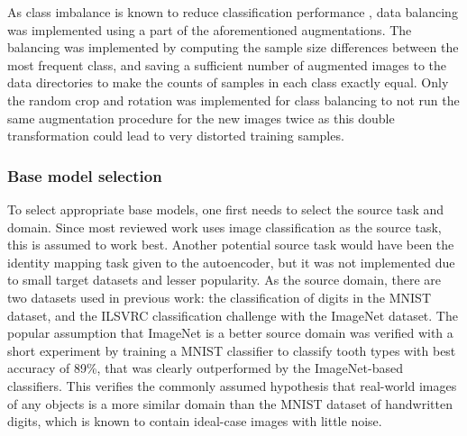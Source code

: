 \documentclass{article}
\begin{document}
As class imbalance is known to reduce classification performance \cite{heLearningImbalancedData2009},
data balancing was implemented using a part of the aforementioned augmentations.
The balancing was implemented by computing the sample size differences between 
the most frequent class, and saving a sufficient number of augmented images 
to the data directories to make the counts of samples in each class 
exactly equal. Only the random crop and rotation was implemented for class 
balancing to not run the same augmentation procedure for the new images twice as 
this double transformation could lead to very distorted training samples.

\subsubsection{Base model selection}



To select appropriate base models, one first needs to select the source task and domain. Since most reviewed work uses image classification as the source task, this is assumed to work best.
Another potential source task would have been the identity mapping task given to the autoencoder,
but it was not implemented due to small target datasets and lesser popularity.
As the source domain, there are two datasets used in previous work: the classification of digits in the MNIST dataset, 
and the ILSVRC classification challenge with the ImageNet dataset. The popular 
assumption that ImageNet is a better source domain was verified with a short experiment by training a MNIST classifier \cite{jamilemnist}
to classify tooth types with best accuracy of 89\%, that was clearly outperformed by the ImageNet-based classifiers. This verifies the commonly assumed hypothesis that real-world images of any objects is a more 
similar domain than the MNIST dataset of handwritten digits, which is known to contain ideal-case images with little noise.
\end{document}
